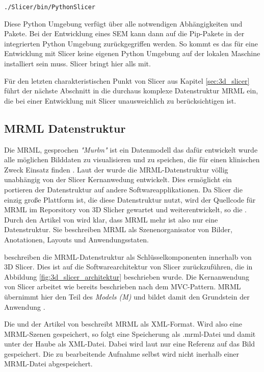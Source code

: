 \texttt{./Slicer/bin/PythonSlicer}

Diese Python Umgebung verfügt über alle notwendigen Abhängigkeiten und Pakete.
Bei der Entwicklung eines SEM kann dann auf die Pip-Pakete in der integrierten
Python Umgebung zurückgegriffen werden. So kommt es das für eine Entwicklung mit
Slicer keine eigenen Python Umgebung auf der lokalen Maschine installiert sein muss.
Slicer bringt hier alls mit.

Für den letzten charakteristischen Punkt von Slicer aus Kapitel
\ref{sec:3d_slicer} führt der nächste Abschnitt in die durchaus komplexe
Datenstruktur MRML ein, die bei einer Entwicklung mit Slicer unausweichlich zu berücksichtigen
ist.

\subsection{MRML Datenstruktur}
\label{subsec:mrml_datenstruktur} Die \ac{MRML}, gesprochen \textit{"Murlm"} ist
ein Datenmodell das dafür entwickelt wurde alle möglichen Bilddaten zu
visualisieren und zu speichen, die für einen klinischen Zweck Einsatz finden \citep[vgl.][]{slicer2024}.
Laut der \citet{slicer2024} wurde die MRML-Datenstruktur völlig unabhängig von
der Slicer Kernanwedung entwickelt. Dies ermöglicht ein portieren der Datenstruktur
auf andere Softwareapplikationen. Da Slicer die einzig große Plattform ist, die diese
Datenstruktur nutzt, wird der Quellcode für MRML im Reporsitory von 3D Slicher
gewartet und weiterentwickelt, so die \citet{slicer2024}. Durch den Artikel von \citet[Seite
1327]{fedorov2012slicer} wird klar, dass MRML mehr ist also nur eine
Datenstruktur. Sie beschreiben MRML als Szenenorganisator von Bilder,
Anotationen, Layouts und Anwendungsstaten.

\citet[Seite 1331]{fedorov2012slicer} beschreiben die MRML-Datenstruktur als Schlüsselkomponenten
innerhalb von 3D Slicer. Dies ist auf die Softwarearchitektur von Slicer
zurückzuführen, die in Abbildung \ref{fig:3d_slicer_architektur} beschrieben wurde.
Die Kernanwendung von Slicer arbeitet wie bereits beschrieben nach dem MVC-Pattern.
MRML übernimmt hier den Teil des \textit{Models (M)} und bildet damit den
Grundstein der Anwendung \citep[vgl.][Seite 1332]{fedorov2012slicer}.

Die \citet{slicer2024} und der Artikel von \citet[Seite 1327]{fedorov2012slicer}
beschreibt MRML als XML-Format. Wird also eine MRML-Szenen gespeichert, so folgt
eine Speicherung als .mrml-Datei und damit unter der Haube als XML-Datei. Dabei wird
laut \citet{slicer2024} nur eine Referenz auf das Bild gespeichert. Die zu bearbeitende
Aufnahme selbst wird nicht inerhalb einer MRML-Datei abgespeichert.


